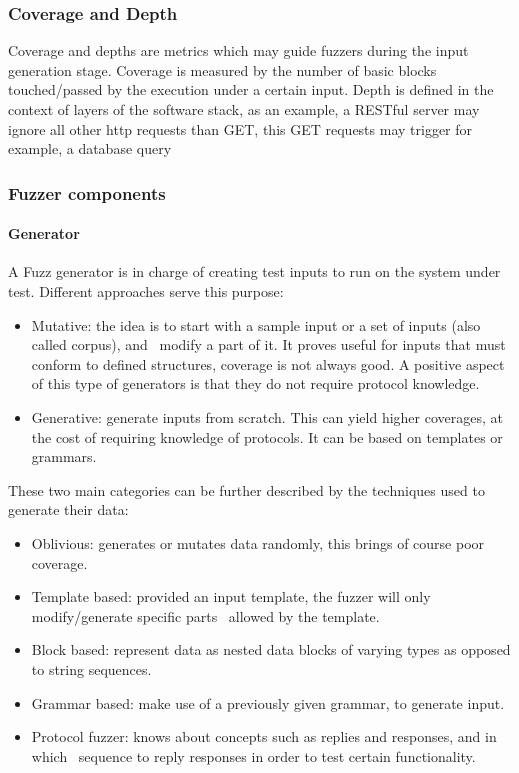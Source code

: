 \subsubsection{Coverage and Depth}

Coverage and depths are metrics which may guide fuzzers during the input generation stage.
Coverage is measured by the number of basic blocks touched/passed by the execution under a certain input.
Depth is defined in the context of layers of the software stack, as an example, a RESTful server may 
ignore all other http requests than GET, this GET requests may trigger for example, a database query \cite{fetzer20}

\subsubsection{Fuzzer components}

\paragraph{Generator}

A Fuzz generator is in charge of creating test inputs to run on the system under test. Different 
approaches serve this purpose\cite{mcnally12}:

\begin{itemize}
    \item Mutative: the idea is to start with a sample input or a set of inputs (also called corpus), and \
    modify a part of it. It proves useful for inputs that must conform to defined structures, coverage is not
    always good. A positive aspect of this type of generators is that they do not require protocol knowledge.
    \item Generative: generate inputs from scratch. This can yield higher coverages, at the cost of requiring
    knowledge of protocols. It can be based on templates or grammars.
\end{itemize}

These two main categories can be further described by the techniques used to generate their data: 

\begin{itemize}
    \item Oblivious: generates or mutates data randomly, this brings of course poor coverage.
    \item Template based: provided an input template, the fuzzer will only modify/generate specific parts \
    allowed by the template.
    \item Block based: represent data as nested data blocks of varying types as opposed to string sequences.
    \item Grammar based: make use of a previously given grammar, to generate input. 
    \item Protocol fuzzer: knows about concepts such as replies and responses, and in which \
    sequence to reply responses in order to test certain functionality.  
\end{itemize}

